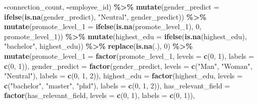 \documentclass[11pt,]{article}
\newenvironment{Shaded}{\begin{snugshade}}{\end{snugshade}}
\newcommand{\AttributeTok}[1]{\textcolor[rgb]{0.13,0.29,0.53}{#1}}
\newcommand{\DecValTok}[1]{\textcolor[rgb]{0.00,0.00,0.81}{#1}}
\newcommand{\FunctionTok}[1]{\textcolor[rgb]{0.13,0.29,0.53}{\textbf{#1}}}
\newcommand{\NormalTok}[1]{#1}
\newcommand{\SpecialCharTok}[1]{\textcolor[rgb]{0.81,0.36,0.00}{\textbf{#1}}}
\newcommand{\StringTok}[1]{\textcolor[rgb]{0.31,0.60,0.02}{#1}}
\begin{document}
\begin{Shaded}
\begin{Highlighting}[]
                \SpecialCharTok{{-}}\NormalTok{connection\_count, }\SpecialCharTok{{-}}\NormalTok{employee\_id) }\SpecialCharTok{\%\textgreater{}\%}
  \FunctionTok{mutate}\NormalTok{(}\AttributeTok{gender\_predict =} \FunctionTok{ifelse}\NormalTok{(}\FunctionTok{is.na}\NormalTok{(gender\_predict), }\StringTok{"Neutral"}\NormalTok{, gender\_predict)) }\SpecialCharTok{\%\textgreater{}\%}
  \FunctionTok{mutate}\NormalTok{(}\AttributeTok{promote\_level\_1 =} \FunctionTok{ifelse}\NormalTok{(}\FunctionTok{is.na}\NormalTok{(promote\_level\_1), }\DecValTok{0}\NormalTok{, promote\_level\_1)) }\SpecialCharTok{\%\textgreater{}\%}
  \FunctionTok{mutate}\NormalTok{(}\AttributeTok{highest\_edu =} \FunctionTok{ifelse}\NormalTok{(}\FunctionTok{is.na}\NormalTok{(highest\_edu), }\StringTok{"bachelor"}\NormalTok{, highest\_edu)) }\SpecialCharTok{\%\textgreater{}\%}
  \FunctionTok{replace}\NormalTok{(}\FunctionTok{is.na}\NormalTok{(.), }\DecValTok{0}\NormalTok{) }\SpecialCharTok{\%\textgreater{}\%}
  \FunctionTok{mutate}\NormalTok{(}\AttributeTok{promote\_level\_1 =} \FunctionTok{factor}\NormalTok{(promote\_level\_1, }
                                  \AttributeTok{levels =} \FunctionTok{c}\NormalTok{(}\DecValTok{0}\NormalTok{, }\DecValTok{1}\NormalTok{), }
                                  \AttributeTok{labels =} \FunctionTok{c}\NormalTok{(}\DecValTok{0}\NormalTok{, }\DecValTok{1}\NormalTok{)),}
         \AttributeTok{gender\_predict =} \FunctionTok{factor}\NormalTok{(gender\_predict, }
                                 \AttributeTok{levels =} \FunctionTok{c}\NormalTok{(}\StringTok{"Man"}\NormalTok{, }\StringTok{"Woman"}\NormalTok{, }\StringTok{"Neutral"}\NormalTok{), }
                                 \AttributeTok{labels =} \FunctionTok{c}\NormalTok{(}\DecValTok{0}\NormalTok{, }\DecValTok{1}\NormalTok{, }\DecValTok{2}\NormalTok{)),}
         \AttributeTok{highest\_edu =} \FunctionTok{factor}\NormalTok{(highest\_edu, }
                              \AttributeTok{levels =} \FunctionTok{c}\NormalTok{(}\StringTok{"bachelor"}\NormalTok{, }\StringTok{"master"}\NormalTok{, }\StringTok{"phd"}\NormalTok{), }
                              \AttributeTok{labels =} \FunctionTok{c}\NormalTok{(}\DecValTok{0}\NormalTok{, }\DecValTok{1}\NormalTok{, }\DecValTok{2}\NormalTok{)),}
         \AttributeTok{has\_relevant\_field =} \FunctionTok{factor}\NormalTok{(has\_relevant\_field, }
                                     \AttributeTok{levels =} \FunctionTok{c}\NormalTok{(}\DecValTok{0}\NormalTok{, }\DecValTok{1}\NormalTok{), }
                                     \AttributeTok{labels =} \FunctionTok{c}\NormalTok{(}\DecValTok{0}\NormalTok{, }\DecValTok{1}\NormalTok{)),}

\end{Highlighting}
\end{Shaded}
\end{document}
